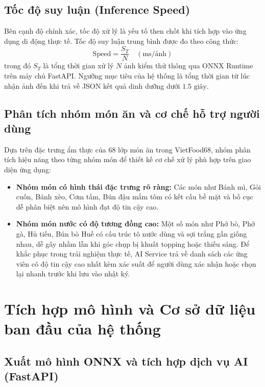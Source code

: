 \documentclass[../main.tex]{subfiles}
\begin{document}
\subsection{Tốc độ suy luận (Inference Speed)}

Bên cạnh độ chính xác, tốc độ xử lý là yếu tố then chốt khi tích hợp vào ứng dụng di động thực tế. Tốc độ suy luận trung bình được đo theo công thức:
\begin{equation}
    \text{Speed} = \frac{S_T}{N} \quad (\text{ms/ảnh})
\end{equation}
trong đó $S_T$ là tổng thời gian xử lý $N$ ảnh kiểm thử thông qua ONNX Runtime trên máy chủ FastAPI. Ngưỡng mục tiêu của hệ thống là tổng thời gian từ lúc nhận ảnh đến khi trả về JSON kết quả dinh dưỡng dưới $1.5\text{ giây}$.

\subsection{Phân tích nhóm món ăn và cơ chế hỗ trợ người dùng}

Dựa trên đặc trưng ẩm thực của 68 lớp món ăn trong VietFood68, nhóm phân tích hiệu năng theo từng nhóm món để thiết kế cơ chế xử lý phù hợp trên giao diện ứng dụng:
\begin{itemize}
    \item \textbf{Nhóm món có hình thái đặc trưng rõ ràng:} Các món như Bánh mì, Gỏi cuốn, Bánh xèo, Cơm tấm, Bún đậu mắm tôm có kết cấu bề mặt và bố cục dễ phân biệt nên mô hình đạt độ tin cậy cao.
    \item \textbf{Nhóm món nước có độ tương đồng cao:} Một số món như Phở bò, Phở gà, Hủ tiếu, Bún bò Huế có cấu trúc tô nước dùng và sợi trắng gần giống nhau, dễ gây nhầm lẫn khi góc chụp bị khuất topping hoặc thiếu sáng. Để khắc phục trong trải nghiệm thực tế, AI Service trả về danh sách các ứng viên có độ tin cậy cao nhất kèm xác suất để người dùng xác nhận hoặc chọn lại nhanh trước khi lưu vào nhật ký.
\end{itemize}

\section{Tích hợp mô hình và Cơ sở dữ liệu ban đầu của hệ thống}
\label{sec:2.5}

\subsection{Xuất mô hình ONNX và tích hợp dịch vụ AI (FastAPI)}
\end{document}
